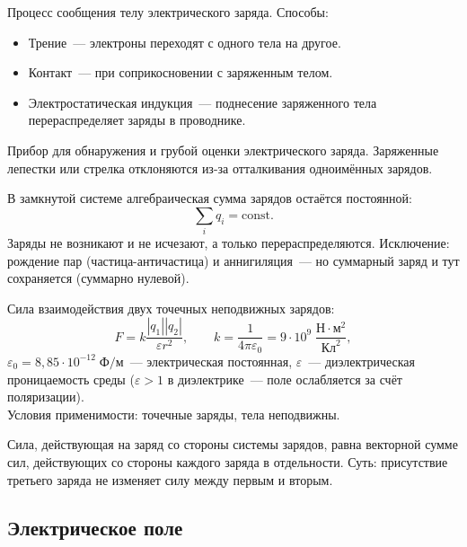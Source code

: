 \documentclass[12pt]{article}
\begin{document}
\begin{definition}
	Процесс сообщения телу электрического заряда. Способы:
	\begin{itemize}
		\item Трение~--- электроны переходят с одного тела на другое.
		\item Контакт~--- при соприкосновении с заряженным телом.
		\item Электростатическая индукция~--- поднесение заряженного тела перераспределяет заряды в проводнике.
	\end{itemize}
\end{definition}

\begin{definition}[Электрометр]
	Прибор для обнаружения и грубой оценки электрического заряда. Заряженные лепестки или стрелка отклоняются из-за отталкивания одноимённых зарядов.
\end{definition}

\begin{law}
	В замкнутой системе алгебраическая сумма зарядов остаётся постоянной:
	\[
		\sum_i q_i = \text{const}.
	\]
	Заряды не возникают и не исчезают, а только перераспределяются. Исключение: рождение пар (частица-античастица) и аннигиляция~--- но суммарный заряд и тут сохраняется (суммарно нулевой).
\end{law}

\begin{law}[Кулона (1785)]
	Сила взаимодействия двух точечных неподвижных зарядов:
	\[
		F = k\frac{|q_1||q_2|}{\varepsilon r^2}, \qquad k = \frac{1}{4\pi\varepsilon_0} = 9 \cdot 10^9 \; \frac{\text{Н}\cdot\text{м}^2}{\text{Кл}^2},
	\]
	$\varepsilon_0 = 8{,}85\cdot10^{-12} \; \text{Ф/м}$~--- электрическая постоянная, $\varepsilon$~--- диэлектрическая проницаемость среды ($\varepsilon > 1$ в диэлектрике~--- поле ослабляется за счёт поляризации).\\
	Условия применимости: точечные заряды, тела неподвижны.
\end{law}

\begin{statement}
	Сила, действующая на заряд со стороны системы зарядов, равна векторной сумме сил, действующих со стороны каждого заряда в отдельности. Суть: присутствие третьего заряда не изменяет силу между первым и вторым.
\end{statement}

\subsection{Электрическое поле}
\end{document}
